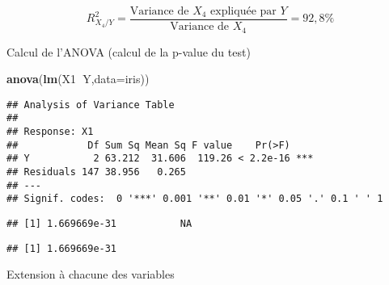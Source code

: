 \documentclass[
]{article}
\newenvironment{Shaded}{\begin{snugshade}}{\end{snugshade}}
\newcommand{\ControlFlowTok}[1]{\textcolor[rgb]{0.13,0.29,0.53}{\textbf{#1}}}
\newcommand{\DataTypeTok}[1]{\textcolor[rgb]{0.13,0.29,0.53}{#1}}
\newcommand{\DecValTok}[1]{\textcolor[rgb]{0.00,0.00,0.81}{#1}}
\newcommand{\KeywordTok}[1]{\textcolor[rgb]{0.13,0.29,0.53}{\textbf{#1}}}
\newcommand{\NormalTok}[1]{#1}
\newcommand{\OperatorTok}[1]{\textcolor[rgb]{0.81,0.36,0.00}{\textbf{#1}}}
\newcommand{\StringTok}[1]{\textcolor[rgb]{0.31,0.60,0.02}{#1}}
\begin{document}
\[
R^2_{X_4 / Y} = \frac{\mbox{Variance de }X_4 \mbox{ expliquée par } Y }{\mbox{Variance de }X_4} = 92,8\%
\]

Calcul de l'ANOVA (calcul de la p-value du test)

\begin{Shaded}
\begin{Highlighting}[]
\KeywordTok{anova}\NormalTok{(}\KeywordTok{lm}\NormalTok{(X1}\OperatorTok{~}\NormalTok{Y,}\DataTypeTok{data=}\NormalTok{iris)) }
\end{Highlighting}
\end{Shaded}

\begin{verbatim}
## Analysis of Variance Table
## 
## Response: X1
##            Df Sum Sq Mean Sq F value    Pr(>F)    
## Y           2 63.212  31.606  119.26 < 2.2e-16 ***
## Residuals 147 38.956   0.265                      
## ---
## Signif. codes:  0 '***' 0.001 '**' 0.01 '*' 0.05 '.' 0.1 ' ' 1
\end{verbatim}

\begin{Shaded}
\end{Shaded}

\begin{verbatim}
## [1] 1.669669e-31           NA
\end{verbatim}

\begin{Shaded}
\end{Shaded}

\begin{verbatim}
## [1] 1.669669e-31
\end{verbatim}

Extension à chacune des variables

\begin{Shaded}
\end{Shaded}
\end{document}
